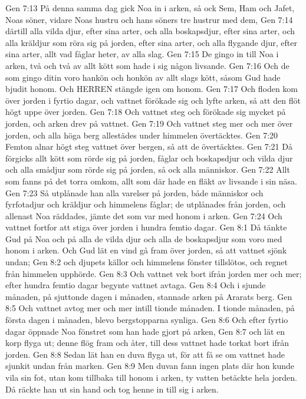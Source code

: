 Gen 7:13  På denna samma dag gick Noa in i arken, så ock Sem, Ham och Jafet, Noas söner, vidare Noas hustru och hans söners tre hustrur med dem,
Gen 7:14  därtill alla vilda djur, efter sina arter, och alla boskapsdjur, efter sina arter, och alla kräldjur som röra sig på jorden, efter sina arter, och alla flygande djur, efter sina arter, allt vad fåglar heter, av alla slag.
Gen 7:15  De gingo in till Noa i arken, två och två av allt kött som hade i sig någon livsande.
Gen 7:16  Och de som gingo ditin voro hankön och honkön av allt slags kött, såsom Gud hade bjudit honom. Och HERREN stängde igen om honom.
Gen 7:17  Och floden kom över jorden i fyrtio dagar, och vattnet förökade sig och lyfte arken, så att den flöt högt uppe över jorden.
Gen 7:18  Och vattnet steg och förökade sig mycket på jorden, och arken drev på vattnet.
Gen 7:19  Och vattnet steg mer och mer över jorden, och alla höga berg allestädes under himmelen övertäcktes.
Gen 7:20  Femton alnar högt steg vattnet över bergen, så att de övertäcktes.
Gen 7:21  Då förgicks allt kött som rörde sig på jorden, fåglar och boskapsdjur och vilda djur och alla smådjur som rörde sig på jorden, så ock alla människor.
Gen 7:22  Allt som fanns på det torra omkom, allt som där hade en fläkt av livsande i sin näsa.
Gen 7:23  Så utplånade han alla varelser på jorden, både människor och fyrfotadjur och kräldjur och himmelens fåglar; de utplånades från jorden, och allenast Noa räddades, jämte det som var med honom i arken.
Gen 7:24  Och vattnet fortfor att stiga över jorden i hundra femtio dagar.
Gen 8:1  Då tänkte Gud på Noa och på alla de vilda djur och alla de boskapsdjur som voro med honom i arken. Och Gud lät en vind gå fram över jorden, så att vattnet sjönk undan;
Gen 8:2  och djupets källor och himmelens fönster tillslötos, och regnet från himmelen upphörde.
Gen 8:3  Och vattnet vek bort ifrån jorden mer och mer; efter hundra femtio dagar begynte vattnet avtaga.
Gen 8:4  Och i sjunde månaden, på sjuttonde dagen i månaden, stannade arken på Ararats berg.
Gen 8:5  Och vattnet avtog mer och mer intill tionde månaden. I tionde månaden, på första dagen i månaden, blevo bergstopparna synliga.
Gen 8:6  Och efter fyrtio dagar öppnade Noa fönstret som han hade gjort på arken,
Gen 8:7  och lät en korp flyga ut; denne flög fram och åter, till dess vattnet hade torkat bort ifrån jorden.
Gen 8:8  Sedan lät han en duva flyga ut, för att få se om vattnet hade sjunkit undan från marken.
Gen 8:9  Men duvan fann ingen plats där hon kunde vila sin fot, utan kom tillbaka till honom i arken, ty vatten betäckte hela jorden. Då räckte han ut sin hand och tog henne in till sig i arken.

